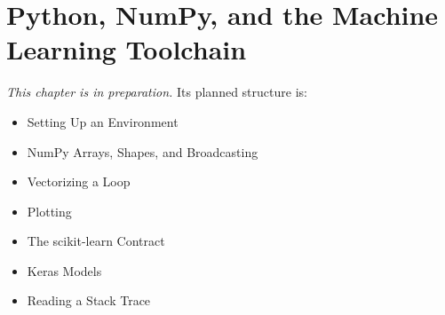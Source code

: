 
\chapter{Python, NumPy, and the Machine Learning Toolchain}
\label{ch:appB}

\noindent\textit{This chapter is in preparation.} Its planned structure is:

\begin{itemize}
  \item Setting Up an Environment
  \item NumPy Arrays, Shapes, and Broadcasting
  \item Vectorizing a Loop
  \item Plotting
  \item The scikit-learn Contract
  \item Keras Models
  \item Reading a Stack Trace
\end{itemize}
